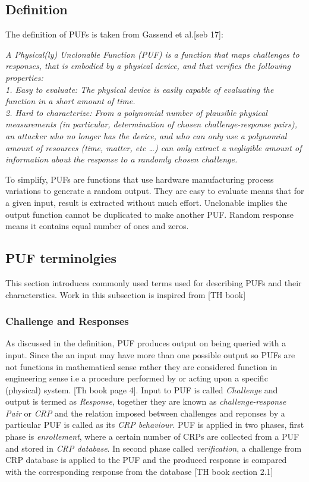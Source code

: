 \subsection{Definition}
The definition of PUFs is taken from Gassend et al.[seb 17]:

\emph{A Physical(ly) Unclonable Function (PUF) is a function that maps challenges to responses, that is embodied by a physical device, and that verifies the following properties:\\
1. Easy to evaluate: The physical device is easily capable of evaluating the function in a short amount of time.\\
2. Hard to characterize: From a polynomial number of plausible physical measurements (in particular, determination of chosen challenge-response pairs), an attacker who no longer has the device, and who can only use a polynomial amount of resources (time, matter, etc \ldots) can only extract a negligible amount of information about the response to a randomly chosen challenge.\\}

To simplify, PUFs are functions that use hardware manufacturing process variations to generate a random output. They are easy to evaluate means that for a given input, result is extracted without much effort. Unclonable implies the output function cannot be duplicated to make another PUF. Random response means it contains equal number of ones and zeros. 

\subsection{PUF terminolgies}
This section introduces commonly used terms used for describing PUFs and their characterstics. Work in this subsection is inspired from [TH book]

\subsubsection{Challenge and Responses}
As discussed in the definition, PUF produces output on being queried with a input. Since the an input may have more than one possible output so PUFs are not functions in mathematical sense rather they are considered function in engineering sense i.e a procedure performed by or acting upon a specific (physical) system. [Th book page 4]. Input to PUF is called \emph{Challenge} and output is termed as \emph{Response}, together they are known as \emph{challenge-response Pair} or \emph{CRP} and the relation imposed between challenges and reponses by a particular PUF is called as its \emph{CRP behaviour}. PUF is applied in two phases, first phase is \emph{enrollement}, where a certain number of CRPs are collected from a PUF and stored in \emph{CRP database}. In second phase called \emph{verification}, a challenge from CRP database is applied to the PUF and the produced response is compared with the corresponding response from the database [TH book section 2.1]


